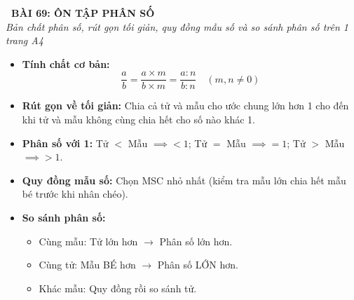 \documentclass[14pt,a4paper,oneside]{extbook}
\begin{document}
\noindent
\begin{tcolorbox}[
  enhanced,
  colback=teal!8!white,
  colframe=teal!80!black,
  arc=3mm, boxrule=1pt,
  left=3mm, right=3mm, top=2mm, bottom=2mm,
  halign=center
]
  {\Large\bfseries\color{teal!90!black}\faBookmark\ BÀI 69: ÔN TẬP PHÂN SỐ}\\[1.5pt]
  {\footnotesize\itshape\color{black!75} Bản chất phân số, rút gọn tối giản, quy đồng mẫu số và so sánh phân số trên 1 trang A4}
\end{tcolorbox}

\vspace{-2.5mm}

\noindent
\begin{minipage}[t]{0.49\textwidth}\vspace{0pt}
\begin{tcolorbox}[
  enhanced,
  colback=blue!4!white,
  colframe=blue!75!black,
  arc=2mm, boxrule=0.8pt,
  left=2mm, right=2mm, top=1.8mm, bottom=1.8mm,
  title={\footnotesize\bfseries\color{white}\faCheckSquare\ 1. Tính chất \& Rút gọn phân số}
]
{\footnotesize
\begin{itemize}\setlength{\itemsep}{1pt}\setlength{\leftskip}{-2.5mm}
  \item \textbf{Tính chất cơ bản:}
  $$\dfrac{a}{b} = \dfrac{a \times m}{b \times m} = \dfrac{a : n}{b : n} \quad (m, n \ne 0)$$
  \item \textbf{Rút gọn về tối giản:} Chia cả tử và mẫu cho ước chung lớn hơn 1 cho đến khi tử và mẫu không cùng chia hết cho số nào khác 1.
  \item \textbf{Phân số với 1:} Tử $<$ Mẫu $\implies <1$; Tử $=$ Mẫu $\implies =1$; Tử $>$ Mẫu $\implies >1$.
\end{itemize}
}
\end{tcolorbox}
\end{minipage}
\hfill
\begin{minipage}[t]{0.49\textwidth}\vspace{0pt}
\begin{tcolorbox}[
  enhanced,
  colback=teal!4!white,
  colframe=teal!75!black,
  arc=2mm, boxrule=0.8pt,
  left=2mm, right=2mm, top=1.8mm, bottom=1.8mm,
  title={\footnotesize\bfseries\color{white}\faArrowsH\ 2. Quy đồng \& So sánh phân số}
]
{\footnotesize
\begin{itemize}\setlength{\itemsep}{1.5pt}\setlength{\leftskip}{-2.5mm}
  \item \textbf{Quy đồng mẫu số:} Chọn MSC nhỏ nhất (kiểm tra mẫu lớn chia hết mẫu bé trước khi nhân chéo).
  \item \textbf{So sánh phân số:}
  \begin{itemize}\setlength{\itemsep}{0.5pt}\setlength{\leftskip}{-2.5mm}
    \item Cùng mẫu: Tử lớn hơn $\to$ Phân số lớn hơn.
    \item Cùng tử: Mẫu BÉ hơn $\to$ Phân số LỚN hơn.
    \item Khác mẫu: Quy đồng rồi so sánh tử.
  \end{itemize}
\end{itemize}
}
\end{tcolorbox}
\end{minipage}
\end{document}
